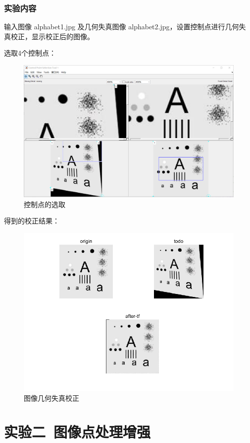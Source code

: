 \documentclass{ctexart}
\begin{document}
\subsubsection{\hei 实验内容}
输入图像 alphabet1.jpg 及几何失真图像 alphabet2.jpg，设置控制点进行几何失
真校正，显示校正后的图像。
\par 选取4个控制点：
\begin{figure}[H]
    \centering
    \includegraphics[scale=0.15]{1_4_1.png}
    \caption{控制点的选取}
\end{figure}
\par 得到的校正结果：
\begin{figure}[H]
    \centering
    \includegraphics[scale=0.3]{1_4_2.png}
    \caption{图像几何失真校正}
\end{figure}
\section{\hei 实验二\ 图像点处理增强}
\end{document}
